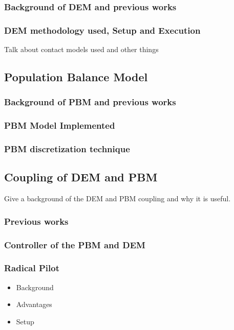 \documentclass[preprint,11pt,authoryear]{elsarticle}
\begin{document}
\subsubsection{Background of DEM and previous works}

\subsubsection{DEM methodology used, Setup and Execution}
Talk about contact models used and other things

\subsection{Population Balance Model}

\subsubsection{Background of PBM and previous works}

\subsubsection{PBM Model Implemented}

\subsubsection{PBM discretization technique}

\subsection{Coupling of DEM and PBM}
Give a  background of the DEM and PBM coupling and why it is useful.
\subsubsection{Previous works}

\subsubsection{Controller of the PBM and DEM}

\subsubsection{Radical Pilot}
\begin{itemize}
\item{Background}
\item{Advantages}
\item{Setup}
\end{itemize}
\end{document}
